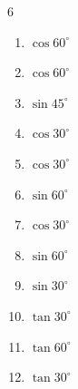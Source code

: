 \begin{multicols}{6}
\begin{enumerate}
  \item $\displaystyle \cos{60^\circ}$


  \item $\displaystyle \cos{60^\circ}$


  \item $\displaystyle \sin{45^\circ}$


\columnbreak %

  \item $\displaystyle \cos{30^\circ}$


  \item $\displaystyle \cos{30^\circ}$


  \item $\displaystyle \sin{60^\circ}$


  \item $\displaystyle \cos{30^\circ}$


  \item $\displaystyle \sin{60^\circ}$


  \item $\displaystyle \sin{30^\circ}$


  \item $\displaystyle \tan{30^\circ}$


  \item $\displaystyle \tan{60^\circ}$


  \item $\displaystyle \tan{30^\circ}$



\end{enumerate}
\end{multicols}
